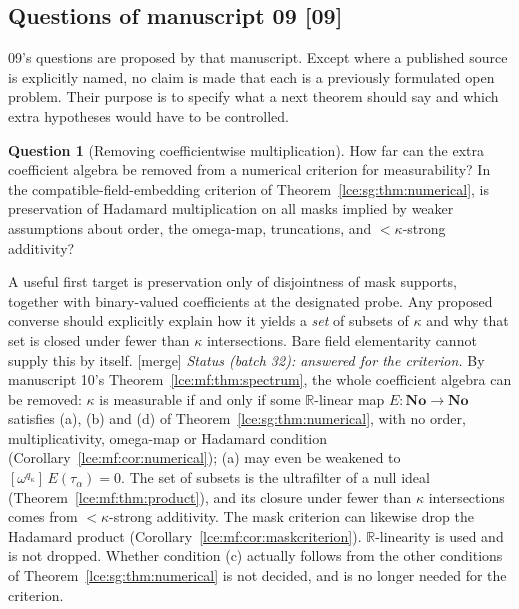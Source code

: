 \documentclass[11pt,letterpaper]{article}
\numberwithin{equation}{section}
\theoremstyle{definition}
\newtheorem{question}[theorem]{Question}
\theoremstyle{remark}
\newcommand{\No}{\mathbf{No}}
\newcommand{\R}{\mathbb R}
\newcommand{\coef}[2]{[\omega^{#1}]\,#2}
\newcommand{\thref}[1]{Theorem~\ref{#1}}
\newcommand{\src}[1]{\textup{\textsf{\small[#1]}}}%
\newcommand{\mergetag}{\textup{\textsf{\small[merge]}}}%
\begin{document}
\subsection{Questions of manuscript 09 \src{09}}
09's questions are proposed by that manuscript. Except where a published
source is explicitly named, no claim is made that each is a previously
formulated open problem. Their purpose is to specify what a next theorem
should say and which extra hypotheses would have to be controlled.

\begin{question}[Removing coefficientwise multiplication]\label{lce:sg:q:converse}
How far can the extra coefficient algebra be removed from a numerical
criterion for measurability? In the compatible-field-embedding criterion of
\thref{lce:sg:thm:numerical}, is preservation of Hadamard multiplication on
all masks implied by weaker assumptions about order, the omega-map,
truncations, and $<\kappa$-strong additivity?
\end{question}
A useful first target is preservation only of disjointness of mask
supports, together with binary-valued coefficients at the designated probe.
Any proposed converse should explicitly explain how it yields a \emph{set}
of subsets of $\kappa$ and why that set is closed under fewer than $\kappa$
intersections. Bare field elementarity cannot supply this by itself.
\mergetag{} \emph{Status (batch 32): answered for the criterion.} By
manuscript 10's \thref{lce:mf:thm:spectrum}, the whole coefficient algebra
can be removed: $\kappa$ is measurable if and only if some $\R$-linear map
$E:\No\to\No$ satisfies (a), (b) and (d) of \thref{lce:sg:thm:numerical},
with no order, multiplicativity, omega-map or Hadamard condition
(Corollary~\ref{lce:mf:cor:numerical}); (a) may even be weakened to
$\coef{q_\kappa}{E(\tau_\alpha)}=0$. The set of subsets is the ultrafilter of
a null ideal (\thref{lce:mf:thm:product}), and its closure under fewer than
$\kappa$ intersections comes from ${<}\kappa$-strong additivity. The mask
criterion can likewise drop the Hadamard product
(Corollary~\ref{lce:mf:cor:maskcriterion}). $\R$-linearity is used and is not
dropped. Whether condition (c) actually follows from the other conditions of
\thref{lce:sg:thm:numerical} is not decided, and is no longer needed for the
criterion.
\end{document}
